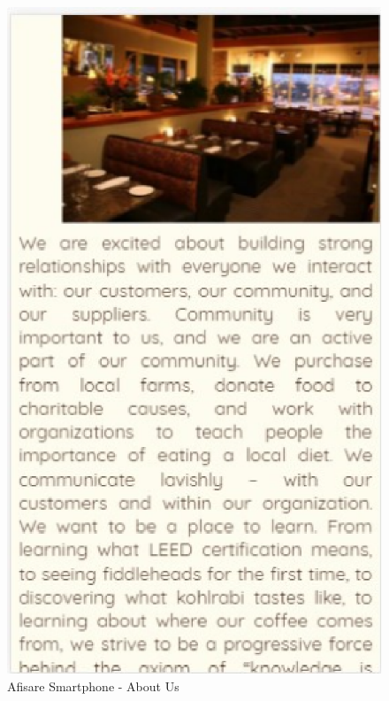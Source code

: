 \documentclass[11pt]{article}
\begin{document}
\begin{figure}[h]
\includegraphics{images/82.eps}
\caption{Afisare Smartphone - About Us}
\end{figure}
\end{document}
